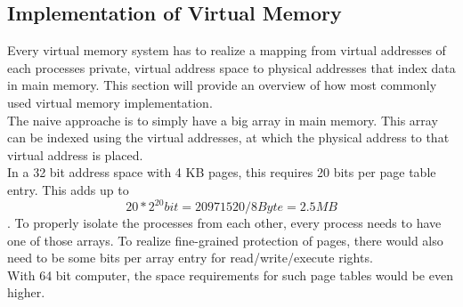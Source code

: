\subsection{Implementation of Virtual Memory}
Every virtual memory system has to realize a mapping from virtual addresses of each processes
private, virtual address space to physical addresses that index data in main memory.
This section will provide an overview of how most commonly used virtual memory implementation.\\

The naive approache is to simply have a big array in main memory. This array can be indexed
using the virtual addresses, at which the physical address to that virtual address is placed.\\
In a 32 bit address space with 4 KB pages, this requires 20 bits per page table entry. This
adds up to \[ 20 * 2^{20} bit = 20971520 / 8 Byte = 2.5 MB \].
To properly isolate the processes from each other, every process needs to have one of those arrays.
To realize fine-grained protection of pages, there would also need to be some bits per array entry
for read/write/execute rights.\\
With 64 bit computer, the space requirements for such page tables would be even higher.

